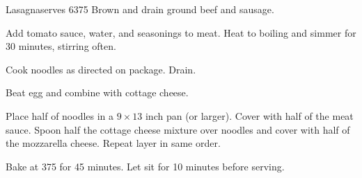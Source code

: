 
\begin{recipe}{Lasagna}{serves 6}{375\0}
    Brown and drain ground beef and sausage.

    Add tomato sauce, water, and seasonings to meat. Heat to boiling and simmer for 30 minutes, stirring often.

    Cook noodles as directed on package. Drain.

    Beat egg and combine with cottage cheese.

    Place half of noodles in a $9 \times 13$ inch pan (or larger). Cover with half of the meat sauce. Spoon half the cottage cheese mixture over noodles and cover with half of the mozzarella cheese. Repeat layer in same order.

    \newstep
    Bake at 375\0 for 45 minutes. Let sit for 10 minutes before serving.
\end{recipe}
